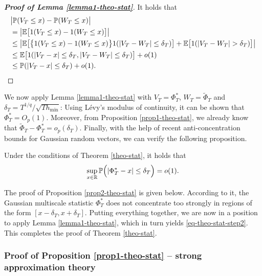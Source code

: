 \documentclass[a4paper,12pt]{article}
\numberwithin{equation}{section}
\begin{document}
\begin{proof}[\textnormal{\textbf{Proof of Lemma \ref{lemma1-theo-stat}}}] 
It holds that 
\begin{align*}
 & \big| \mathbb{P}(V_T \le x) - \mathbb{P}(W_T \le x) \big| \\
 & = \big| \mathbb{E} \big[ 1(V_T \le x) - 1(W_T \le x) \big] \big| \\
 & \le \big| \mathbb{E} \big[ \big\{ 1(V_T \le x) - 1(W_T \le x) \big\} 1(|V_T - W_T| \le \delta_T) \big] + \mathbb{E} \big[ 1(|V_T - W_T| > \delta_T) \big] \big| \\
 & \le \mathbb{E} \big[ 1(|V_T - x| \le \delta_T, |V_T - W_T| \le \delta_T) \big] + o(1) \\
 & \le \mathbb{P} (|V_T - x| \le \delta_T) + o(1). \qedhere
\end{align*}
\end{proof}
We now apply Lemma \ref{lemma1-theo-stat} with $V_T = \Phi^*_T$, $W_T = \widetilde{\Phi}_T$ and $\delta_T = T^{1/q} / \sqrt{T h_{\min}}$: Using L{\'e}vy's modulus of continuity, it can be shown that $\Phi_T^* = O_p(1)$. Moreover, from Proposition \ref{prop1-theo-stat}, we already know that $\widetilde{\Phi}_T - \Phi_T^* = o_p(\delta_T)$. Finally, with the help of recent anti-concentration bounds for Gaussian random vectors, we can verify the following proposition.
\begin{propA}\label{prop2-theo-stat}
Under the conditions of Theorem \ref{theo-stat}, it holds that 
\[ \sup_{x \in \mathbb{R}} \mathbb{P} \Big( | \Phi_T^* - x | \le \delta_T \Big) = o(1). \]
\end{propA}
The proof of Proposition \ref{prop2-theo-stat} is given below. According to it, the Gaussian multiscale statistic $\Phi_T^*$ does not concentrate too strongly in regions of the form $[x - \delta_T,x + \delta_T]$. Putting everything together, we are now in a position to apply Lemma \ref{lemma1-theo-stat}, which in turn yields \eqref{eq-theo-stat-step2}. This completes the proof of Theorem \ref{theo-stat}. 



\subsubsection*{Proof of Proposition \ref{prop1-theo-stat} -- strong approximation theory}
\end{document}
